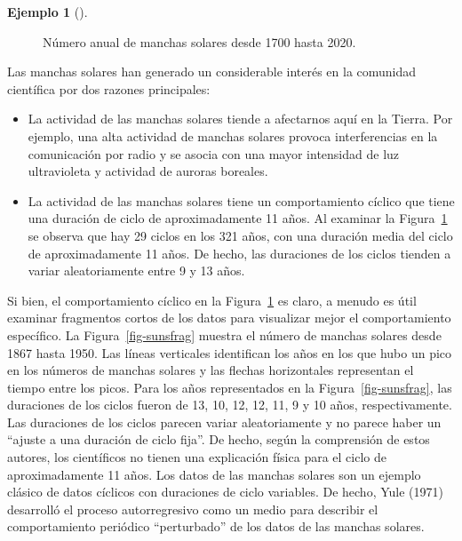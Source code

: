 \documentclass[
  us-letterpaper,
]{scrreprt}
\theoremstyle{plain}
\theoremstyle{definition}
\theoremstyle{definition}
\newtheorem{example}{Ejemplo}[chapter]
\theoremstyle{plain}
\theoremstyle{remark}
\begin{document}
\begin{example}[]
\begin{tcolorbox}
\begin{figure}[H]
{}

\caption{\label{fig-sunspot}Número anual de manchas solares desde 1700
hasta 2020.}

\end{figure}%

Las manchas solares han generado un considerable interés en la comunidad
científica por dos razones principales:

\begin{itemize}
\item
  La actividad de las manchas solares tiende a afectarnos aquí en la
  Tierra. Por ejemplo, una alta actividad de manchas solares provoca
  interferencias en la comunicación por radio y se asocia con una mayor
  intensidad de luz ultravioleta y actividad de auroras boreales.
\item
  La actividad de las manchas solares tiene un comportamiento cíclico
  que tiene una duración de ciclo de aproximadamente 11 años. Al
  examinar la Figura~\ref{fig-sunspot} se observa que hay 29 ciclos en
  los 321 años, con una duración media del ciclo de aproximadamente 11
  años. De hecho, las duraciones de los ciclos tienden a variar
  aleatoriamente entre 9 y 13 años.
\end{itemize}

Si bien, el comportamiento cíclico en la Figura~\ref{fig-sunspot} es
claro, a menudo es útil examinar fragmentos cortos de los datos para
visualizar mejor el comportamiento específico. La
Figura~\ref{fig-sunsfrag} muestra el número de manchas solares desde
1867 hasta 1950. Las líneas verticales identifican los años en los que
hubo un pico en los números de manchas solares y las flechas
horizontales representan el tiempo entre los picos. Para los años
representados en la Figura~\ref{fig-sunsfrag}, las duraciones de los
ciclos fueron de 13, 10, 12, 12, 11, 9 y 10 años, respectivamente. Las
duraciones de los ciclos parecen variar aleatoriamente y no parece haber
un ``ajuste a una duración de ciclo fija''. De hecho, según la
comprensión de estos autores, los científicos no tienen una explicación
física para el ciclo de aproximadamente 11 años. Los datos de las
manchas solares son un ejemplo clásico de datos cíclicos con duraciones
de ciclo variables. De hecho, Yule (1971) desarrolló el proceso
autorregresivo como un medio para describir el comportamiento periódico
``perturbado'' de los datos de las manchas solares.

\begin{figure}[H]

\centering{

}
\end{figure}
\end{tcolorbox}
\end{example}
\end{document}
